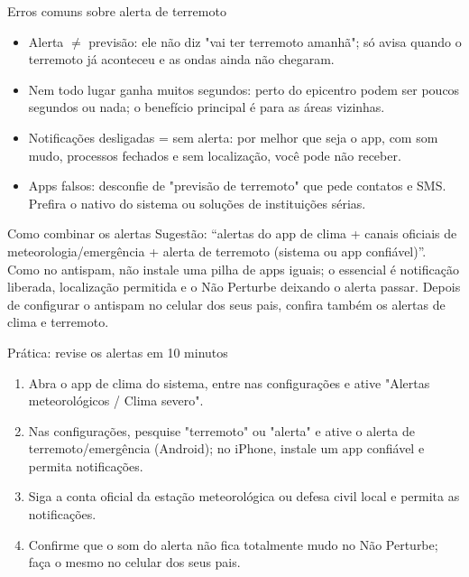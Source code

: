 \begin{tcbwarn}{Erros comuns sobre alerta de terremoto}
\begin{itemize}
  \item Alerta $\neq$ previsão: ele não diz "vai ter terremoto amanhã"; só avisa quando o terremoto já aconteceu e as ondas ainda não chegaram.
  \item Nem todo lugar ganha muitos segundos: perto do epicentro podem ser poucos segundos ou nada; o benefício principal é para as áreas vizinhas.
  \item Notificações desligadas = sem alerta: por melhor que seja o app, com som mudo, processos fechados e sem localização, você pode não receber.
  \item Apps falsos: desconfie de "previsão de terremoto" que pede contatos e SMS. Prefira o nativo do sistema ou soluções de instituições sérias.
\end{itemize}

\end{tcbwarn}

\begin{tcbinfo}{Como combinar os alertas}
Sugestão: “alertas do app de clima + canais oficiais de meteorologia/emergência + alerta de terremoto (sistema ou app confiável)”. Como no antispam, não instale uma pilha de apps iguais; o essencial é notificação liberada, localização permitida e o Não Perturbe deixando o alerta passar. Depois de configurar o antispam no celular dos seus pais, confira também os alertas de clima e terremoto.

\end{tcbinfo}

\begin{tcbpractice}{Prática: revise os alertas em 10 minutos}
\begin{enumerate}
  \item Abra o app de clima do sistema, entre nas configurações e ative "Alertas meteorológicos / Clima severo".
  \item Nas configurações, pesquise "terremoto" ou "alerta" e ative o alerta de terremoto/emergência (Android); no iPhone, instale um app confiável e permita notificações.
  \item Siga a conta oficial da estação meteorológica ou defesa civil local e permita as notificações.
  \item Confirme que o som do alerta não fica totalmente mudo no Não Perturbe; faça o mesmo no celular dos seus pais.
\end{enumerate}

\end{tcbpractice}

